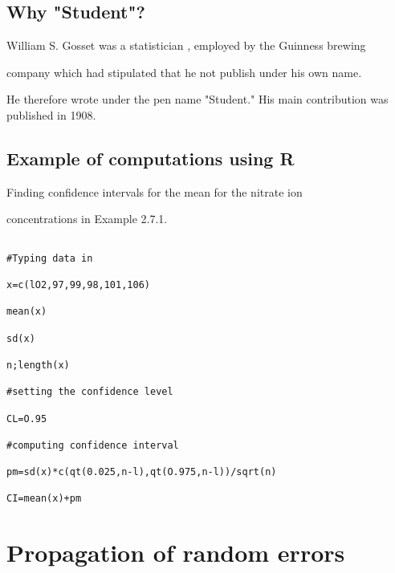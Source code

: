  







\subsection{Why "Student"?}

 

William S. Gosset was a statistician , employed by the Guinness brewing

company which had stipulated that he not publish under his own name.

He therefore wrote under the pen name "Student." His main contribution was published in 1908.

 

\subsection{Example of computations using R}

Finding confidence intervals for the mean for the nitrate ion

concentrations in Example 2.7.1.

\begin{verbatim}

#Typing data in

x=c(lO2,97,99,98,101,106)

mean(x)

sd(x)

n;length(x)

#setting the confidence level

CL=O.95

#computing confidence interval

pm=sd(x)*c(qt(0.025,n-l),qt(O.975,n-l))/sqrt(n)

CI=mean(x)+pm

\end{verbatim}

 






 

\section{Propagation of random errors}

